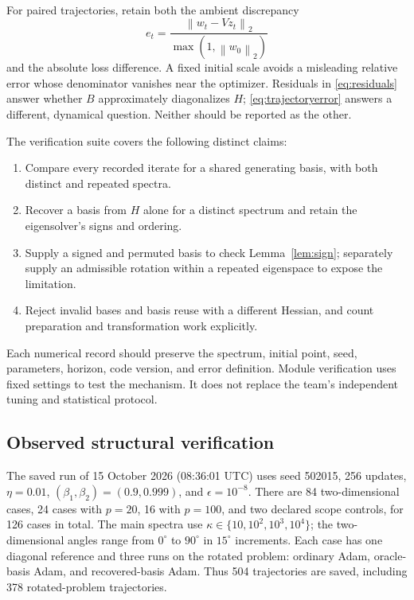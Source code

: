 \documentclass[11pt,a4paper]{article}
\newcommand{\norm}[1]{\left\lVert#1\right\rVert}
\begin{document}
For paired trajectories, retain both the ambient discrepancy
\begin{equation}
 e_t=\frac{\norm{w_t-Vz_t}_2}{\max(1,\norm{w_0}_2)}
 \label{eq:trajectoryerror}
\end{equation}
and the absolute loss difference. A fixed initial scale avoids a misleading
relative error whose denominator vanishes near the optimizer. Residuals in
\eqref{eq:residuals} answer whether $B$ approximately diagonalizes $H$;
\eqref{eq:trajectoryerror} answers a different, dynamical question. Neither
should be reported as the other.

The verification suite covers the following distinct claims:
\begin{enumerate}
 \item Compare every recorded iterate for a shared generating basis, with both
 distinct and repeated spectra.
 \item Recover a basis from $H$ alone for a distinct spectrum and retain the
 eigensolver's signs and ordering.
 \item Supply a signed and permuted basis to check
 Lemma~\ref{lem:sign}; separately supply an admissible rotation within a repeated
 eigenspace to expose the limitation.
 \item Reject invalid bases and basis reuse with a different Hessian, and
 count preparation and transformation work explicitly.
\end{enumerate}
Each numerical record should preserve the spectrum, initial point, seed,
parameters, horizon, code version, and error definition. Module verification
uses fixed settings to test the mechanism. It does not replace the team's
independent tuning and statistical protocol.

\subsection{Observed structural verification}
The saved run of 15 October 2026 (08:36:01 UTC) uses seed 502015, 256 updates,
$\eta=0.01$, $(\beta_1,\beta_2)=(0.9,0.999)$, and $\epsilon=10^{-8}$.
There are 84 two-dimensional cases, 24 cases with $p=20$, 16 with $p=100$,
and two declared scope controls, for 126 cases in total. The main spectra use
$\kappa\in\{10,10^2,10^3,10^4\}$; the two-dimensional angles range from
$0^\circ$ to $90^\circ$ in $15^\circ$ increments. Each case has one diagonal
reference and three runs on the rotated problem: ordinary Adam, oracle-basis
Adam, and recovered-basis Adam. Thus 504 trajectories are saved, including
378 rotated-problem trajectories.
\end{document}
